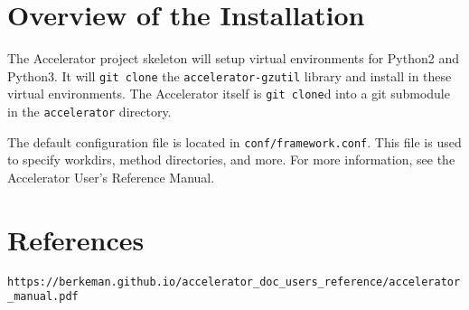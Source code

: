 \documentclass[a4paper]{article}
\begin{document}
\section{Overview of the Installation}
The Accelerator project skeleton will setup virtual environments for
Python2 and Python3.  It will \texttt{git clone} the
\texttt{accelerator-gzutil} library and install in these virtual
environments.  The Accelerator itself is \texttt{git clone}d into a
git submodule in the \texttt{accelerator} directory.

The default configuration file is located in
\texttt{conf/framework.conf}.  This file is used to specify workdirs,
method directories, and more.  For more information, see the
Accelerator User's Reference Manual.



\section*{References}
\texttt{https://berkeman.github.io/accelerator\_doc\_users\_reference/accelerator\_manual.pdf}
\end{document}
